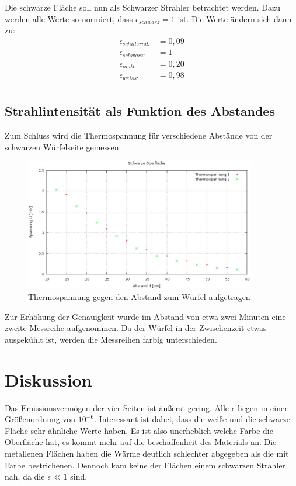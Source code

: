 Die schwarze Fläche soll nun als Schwarzer Strahler betrachtet werden. Dazu werden alle Werte so normiert, dass $\epsilon_{schwarz}=1$ ist.
Die Werte ändern sich dann zu:
\begin{align*}
\epsilon_{schillernd: }		&= 0,09      \\
\epsilon_{schwarz: }	 	&= 1         \\
\epsilon_{matt: }		 	&= 0,20      \\
\epsilon_{weiss: } 			&= 0,98      \\
\end{align*}
\subsection{Strahlintensität als Funktion des Abstandes}
Zum Schluss wird die Thermospannung für verschiedene Abstände von der schwarzen Würfelseite gemessen.

\begin{figure}[H]
\includegraphics[width=0.9\textwidth]{pics/temp_abstand.jpg}
\caption{Thermospannung gegen den Abstand zum Würfel aufgetragen}
\label{abstand}
\end{figure}

Zur Erhöhung der Genauigkeit wurde im Abstand von etwa zwei Minuten eine zweite Messreihe aufgenommen. Da der Würfel in der Zwischenzeit etwas ausgekühlt ist, werden die Messreihen farbig unterschieden.

\section{Diskussion}
Das Emissionsvermögen der vier Seiten ist äußerst gering. Alle $\epsilon$ liegen in einer Größenordnung von $10^{-6}$. Interessant ist dabei, dass die weiße und die schwarze Fläche sehr ähnliche Werte haben. Es ist also unerheblich welche Farbe die Oberfläche hat, es kommt mehr auf die beschaffenheit des Materials an. Die metallenen Flächen haben die Wärme deutlich schlechter abgegeben als die mit Farbe bestrichenen. Dennoch kam keine der Flächen einem schwarzen Strahler nah, da die $\epsilon \ll 1$ sind.

